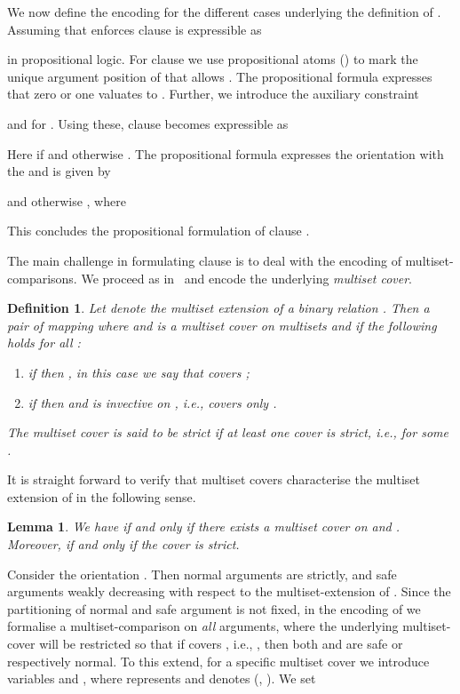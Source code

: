 \documentclass{LMCS}
\newtheorem{definition}[thm]{Definition}
\newtheorem{lemma}[thm]{Lemma}
\begin{document}
We now define the encoding for the different cases underlying the definition of .
Assuming that  enforces  clause  is expressible
as 

in propositional logic. 
For clause  we use propositional atoms  ()
to mark the unique argument position of  that allows
. 
The propositional formula  expresses that zero or one
 valuates to . 
Further, we introduce the auxiliary constraint 

and  for .
Using these, clause  becomes expressible as 

Here  if  and otherwise .
The propositional formula  expresses the orientation with the  and is given by

and otherwise , where

This concludes the propositional formulation of clause .

The main challenge in formulating clause 
is to deal with the encoding of multiset-comparisons. 
We proceed as in~\cite{SK07} and encode the underlying \emph{multiset cover}.
\begin{definition}
Let  denote the multiset extension of a binary relation .
Then a pair of mapping  
where  
and 
is a multiset cover on multisets  and 
if the following holds for all :
\begin{enumerate}[labelsep=*,leftmargin=*]\label{d:mscover}
\item\label{d:mscover:1} if  then , in this case we say that  \emph{covers} ; 
\item\label{d:mscover:2} if  then  and  is invective on , 
  i.e.,  covers only .
\end{enumerate}
The multiset cover  is said to be \emph{strict} if at least one cover is strict, 
i.e.,  for some .
\end{definition}

It is straight forward to verify that multiset covers characterise the multiset extension
of  in the following sense.
\begin{lemma}
  We have  if and only if there 
  exists a multiset cover  on  and .
  Moreover,  if and only if the cover is strict.
\end{lemma}

Consider the orientation . 
Then normal arguments are strictly, and safe arguments weakly decreasing with 
respect to the multiset-extension of . 
Since the partitioning of normal and safe argument is not fixed, 
in the encoding of  we formalise a multiset-comparison on \emph{all} arguments, 
where the underlying multiset-cover  
will be restricted so that if  covers , i.e., , 
then both  and  are safe or respectively normal.
To this extend, for a specific multiset cover  we introduce variables  and 
, where  represents  and
 denotes  (, ).
We set
\end{document}
